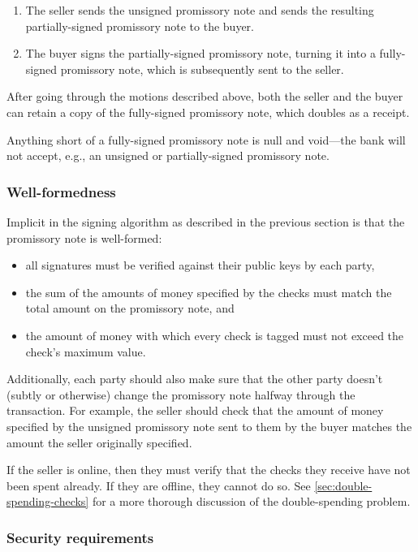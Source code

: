 \documentclass[12pt,a4paper]{article}
\begin{document}
\begin{multicols}{2}
\begin{enumerate}
		\item The seller sends the unsigned promissory note and sends the resulting partially-signed promissory note to the buyer.
		
		\item The buyer signs the partially-signed promissory note, turning it into a fully-signed promissory note, which is subsequently sent to the seller.
	\end{enumerate}

	After going through the motions described above, both the seller and the buyer can retain a copy of the fully-signed promissory note, which doubles as a receipt.
	
	Anything short of a fully-signed promissory note is null and void---the bank will not accept, e.g., an unsigned or partially-signed promissory note.
	
	\subsubsection{Well-formedness}

	Implicit in the signing algorithm as described in the previous section is that the promissory note is well-formed:
	
	\begin{itemize}
		\item all signatures must be verified against their public keys by each party,
		\item the sum of the amounts of money specified by the checks must match the total amount on the promissory note, and
		\item the amount of money with which every check is tagged must not exceed the check's maximum value.
	\end{itemize}

	Additionally, each party should also make sure that the other party doesn't (subtly or otherwise) change the promissory note halfway through the transaction. For example, the seller should check that the amount of money specified by the unsigned promissory note sent to them by the buyer matches the amount the seller originally specified.
	
	If the seller is online, then they must verify that the checks they receive have not been spent already. If they are offline, they cannot do so. See \autoref{sec:double-spending-checks} for a more thorough discussion of the double-spending problem.

	\subsubsection{Security requirements}


\end{multicols}
\end{document}
